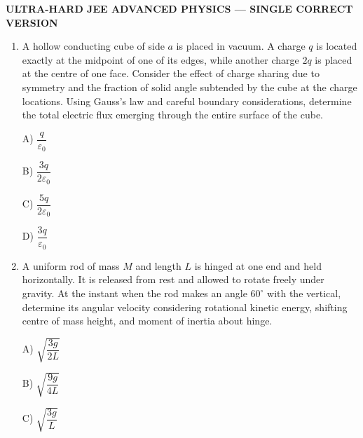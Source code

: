 \documentclass[12pt]{article}
\begin{document}
\begin{center}
{\Large \textbf{ULTRA-HARD JEE ADVANCED PHYSICS — SINGLE CORRECT VERSION}}
\end{center}

\begin{enumerate}

\item A hollow conducting cube of side \(a\) is placed in vacuum. A charge \(q\) is located exactly at the midpoint of one of its edges, while another charge \(2q\) is placed at the centre of one face. Consider the effect of charge sharing due to symmetry and the fraction of solid angle subtended by the cube at the charge locations. Using Gauss’s law and careful boundary considerations, determine the total electric flux emerging through the entire surface of the cube.

A) \(\dfrac{q}{\varepsilon_0}\)  

B) \(\dfrac{3q}{2\varepsilon_0}\) 

C) \(\dfrac{5q}{2\varepsilon_0}\) 

D) \(\dfrac{3q}{\varepsilon_0}\)

\item A uniform rod of mass \(M\) and length \(L\) is hinged at one end and held horizontally. It is released from rest and allowed to rotate freely under gravity. At the instant when the rod makes an angle \(60^\circ\) with the vertical, determine its angular velocity considering rotational kinetic energy, shifting centre of mass height, and moment of inertia about hinge.

\begin{center}
\end{center}

A) \(\sqrt{\dfrac{3g}{2L}}\)  

B) \(\sqrt{\dfrac{9g}{4L}}\) 

C) \(\sqrt{\dfrac{3g}{L}}\)  


\end{enumerate}
\end{document}
